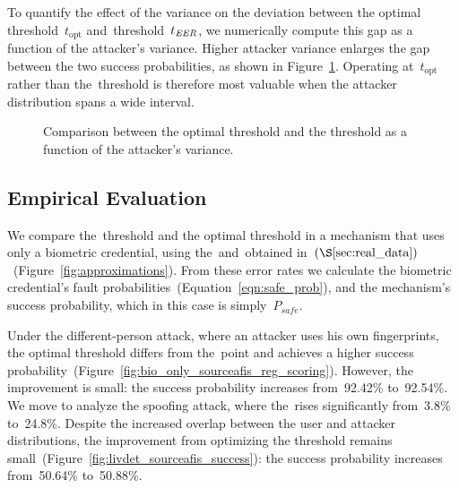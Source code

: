 \documentclass[conference,compsoc]{IEEEtran}
\begin{document}
To quantify the effect of the variance on the deviation between the optimal threshold~$t_{\text{opt}}$ and~\EER threshold~$t_{\textit{EER}}$, we numerically compute this gap as a function of the attacker's variance. Higher attacker variance enlarges the gap between the two success probabilities, as shown in Figure~\ref{fig:gap_vs_variance_parabola_success}. Operating at~$t_{\text{opt}}$ rather than the~\EER threshold is therefore most valuable when the attacker distribution spans a wide interval.

\begin{figure}[t]
\centering
{}

\caption{Comparison between the optimal threshold and the \EER threshold as a function of the attacker's variance.}
\label{fig:gap_vs_variance_parabola_success}
\end{figure}

\subsection{Empirical Evaluation}\label{sec:eval_single_cred}
\noindent
We compare the~\EER threshold and the optimal threshold in a mechanism that uses only a biometric credential, using the~\FAR and~\FRR obtained in~$(\S\ref{sec:real_data})$~(Figure~\ref{fig:approximations}). From these error rates we calculate the biometric credential’s fault probabilities~(Equation~\ref{eqn:safe_prob}), and the mechanism’s success probability, which in this case is simply~$P_{safe}$.

Under the different-person attack, where an attacker uses his own fingerprints, the optimal threshold differs from the~\EER point and achieves a higher success probability~(Figure~\ref{fig:bio_only_sourceafis_reg_scoring}). However, the improvement is small: the success probability increases from~92.42\% to~92.54\%. We move to analyze the spoofing attack, where the~\EER rises significantly from~3.8\% to~24.8\%. Despite the increased overlap between the user and attacker distributions, the improvement from optimizing the threshold remains small~(Figure~\ref{fig:livdet_sourceafis_success}): the success probability increases from~50.64\% to~50.88\%. 
\end{document}
